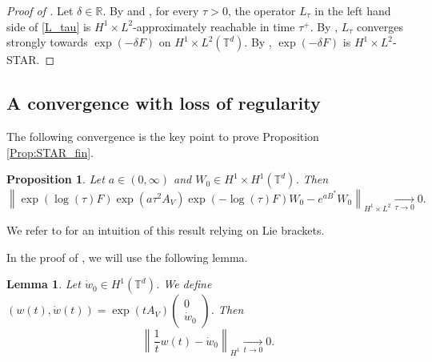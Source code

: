 \documentclass[a4paper]{article}
\theoremstyle{plain}
\newtheorem{lemma}[theorem]{Lemma}
\newtheorem{proposition}[theorem]{Proposition}
\newcommand{\T}{\mathbb{T}}
\newcommand{\R}{\mathbb{R}}
\begin{document}
\begin{proof}[Proof of ]
Let $\delta \in \R$. By  and , for every $\tau>0$, the operator $L_{\tau}$ in the left hand side of \eqref{L_tau}
is $H^1 \times L^2$-approximately reachable in time $\tau^+$. By , $L_{\tau}$ converges strongly towards $\exp(-\delta F)$ on $H^1 \times L^2(\T^d)$. By , $\exp(-\delta F)$ is $H^1 \times L^2$-STAR.
\end{proof}


\subsection{A convergence with loss of regularity}
\label{subsec:CV_H1H1}

The following convergence is the key point to prove Proposition \ref{Prop:STAR_fin}.

\begin{proposition} \label{Prop:H1*H1}
Let 
$a \in (0,\infty)$ and 
$W_0 \in H^1 \times H^1(\T^d)$. Then
$$\left\| \exp(\log(\tau)F) \exp( a \tau^2 A_V) \exp(-\log(\tau)F)W_0
- e^{a B^*}W_0
\right\|_{H^1\times L^2} \underset{\tau \to 0}{\longrightarrow} 0.$$
\end{proposition}
We refer to  for an intuition of this result relying on Lie brackets.

In the proof of , we will use the following lemma.

\begin{lemma} \label{Lem:TP}
Let 
$\dot{w}_0 \in H^1(\T^d)$. 
We define
$(w(t),\dot{w}(t))=\exp(t A_V) \begin{pmatrix}
0 \\ \dot{w}_0
\end{pmatrix}$.
Then
$$\left\| \frac{1}{t} w(t) - \dot{w}_0 \right\|_{H^1} \underset{t \to 0}{\longrightarrow} 0. $$
\end{lemma}
\end{document}
